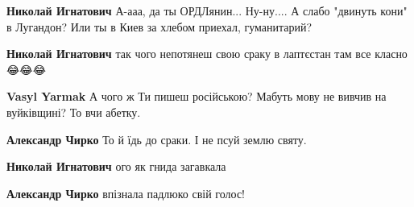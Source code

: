 \begin{itemize}
\begin{itemize}
 
\textbf{Николай Игнатович}
А-ааа, да ты ОРДЛянин... Ну-ну....
А слабо "двинуть кони" в Лугандон? Или ты в Киев за хлебом приехал, гуманитарий?

 
\textbf{Николай Игнатович} так чого непотянеш свою сраку в лаптєстан там все класно 😂😂😂

 
\textbf{Vasyl Yarmak} А чого ж Ти пишеш російською? Мабуть мову не вивчив на вуйківщині? То вчи абетку.

 
\textbf{Александр Чирко} То й їдь до сраки. І не псуй землю святу.

 
\textbf{Николай Игнатович} ого як гнида загавкала

 
\textbf{Александр Чирко} впізнала падлюко свій голос!
\end{itemize}

 

\end{itemize}
